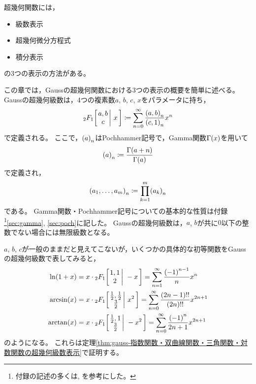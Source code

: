 \documentclass[a4paper,draft]{ltjsarticle}
\begin{document}
超幾何関数には，
\begin{itemize}
    \item 級数表示
    \item 超幾何微分方程式
    \item 積分表示
\end{itemize}
の3つの表示の方法がある。

この章では，Gaussの超幾何関数における3つの表示の概要を簡単に述べる。
Gaussの超幾何級数は，4つの複素数$a$, $b$, $c$, $x$をパラメータに持ち，
\begin{equation}
    \label{eq:まえがき-gauss-級数}
    \Gauss{a}{b}{c}{x}\coloneqq \sum_{n=0}^\infty \dfrac{\poch{a,b}{n}}{\poch{c,1}{n}}x^n
\end{equation}
で定義される。
ここで，$\poch{a}{n}$はPochhammer記号で，Gamma関数$\fun{\Gamma}{x}$を用いて
\begin{equation}
    \poch{a}{n}\coloneqq \dfrac{\fun{\Gamma}{a+n}}{\fun{\Gamma}{a}}
\end{equation}
で定義され，
\begin{equation}
    \poch{a_1,\dots,a_m}{n}\coloneqq \prod_{k=1}^m \poch{a_k}{n}
\end{equation}
である。
Gamma関数・Pochhammer記号についての基本的な性質は付録\footnote{付録の記述の多くは\cite{nkswtr}, \cite{takenoko}を参考にした。}\ref{sec:gamma}, \ref{sec:poch}に記した。
Gaussの超幾何級数は，$a$, $b$が共に$0$以下の整数でない場合には無限級数となる。

$a$, $b$, $c$が一般のままだと見えてこないが，いくつかの具体的な初等関数をGaussの超幾何級数で表してみると，
\begin{align}
    \fun{\ln}{1+x}&=x\cdot \Gauss{1}{1}{2}{-x}=\sum_{n=1}^\infty \dfrac{\pare{-1}^{n-1}}{n}x^n
    \\
    \fun{\arcsin}{x}&=x\cdot \Gauss{\frac{1}{2}}{\frac{1}{2}}{\frac{3}{2}}{x^2}
    =\sum_{n=0}^\infty \dfrac{\pare{2n-1}!!}{\pare{2n}!!}x^{2n+1}
    \\
    \fun{\arctan}{x}&=x\cdot \Gauss{\frac{1}{2}}{1}{\frac{3}{2}}{-x^2}=\sum_{n=0}^\infty \dfrac{\pare{-1}^n}{2n+1}x^{2n+1}
\end{align}
のようになる。
これらは定理\ref{thm:gauss-指数関数・双曲線関数・三角関数・対数関数の超幾何級数表示}で証明する。
\end{document}
